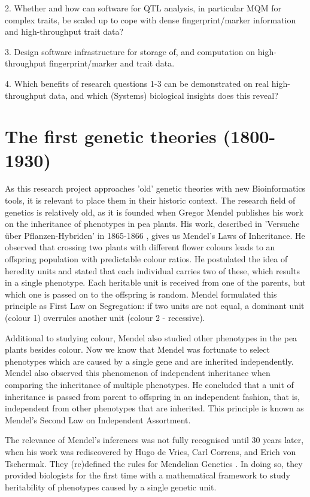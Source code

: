 2. Whether and how can software for QTL analysis, in particular MQM for complex traits, be scaled up to cope with dense fingerprint/marker information and high-throughput trait data?

3. Design software infrastructure for storage of, and computation on high-throughput fingerprint/marker and trait data.

4. Which benefits of research questions 1-3 can be demonstrated on real high-throughput data, and which (Systems) biological insights does this reveal? 

\section{The first genetic theories (1800-1930)}
As this research project approaches 'old' genetic theories with new Bioinformatics tools, it is relevant to place 
them in their historic context. The research field of genetics is relatively old, as it is founded when Gregor 
Mendel publishes his work on the inheritance of phenotypes in pea plants. His work, described in 'Versuche über 
Pflanzen-Hybriden' in 1865-1866 \cite{Mendel:1866}, gives us Mendel's Laws of Inheritance. He observed that crossing 
two plants with different flower colours leads to an offspring population with predictable colour ratios. He 
postulated the idea of heredity units and stated that each individual carries two of these, which results in a 
single phenotype. Each heritable unit is received from one of the parents, but which one is passed on to the 
offspring is random. Mendel formulated this principle as First Law on Segregation: if two units are not equal, 
a dominant unit (colour 1) overrules another unit (colour 2 - recessive). 

Additional to studying colour, Mendel also studied other phenotypes in the pea plants besides colour. Now we know 
that Mendel was fortunate to select phenotypes which are caused by a single gene and are inherited independently. 
Mendel also observed this phenomenon of independent inheritance when comparing the inheritance of multiple 
phenotypes. He concluded that a unit of inheritance is passed from parent to offspring in an independent fashion, 
that is, independent  from other phenotypes that are inherited. This principle is known as Mendel's Second Law 
on Independent Assortment.

The relevance of Mendel's inferences was not fully recognised until 30 years later, when his work was rediscovered 
by Hugo de Vries, Carl Correns, and Erich von Tschermak. They (re)defined the rules for Mendelian Genetics \cite{deVries:1889}. 
In doing so, they provided biologists for the first time with a mathematical framework to study heritability of 
phenotypes caused by a single genetic unit.

